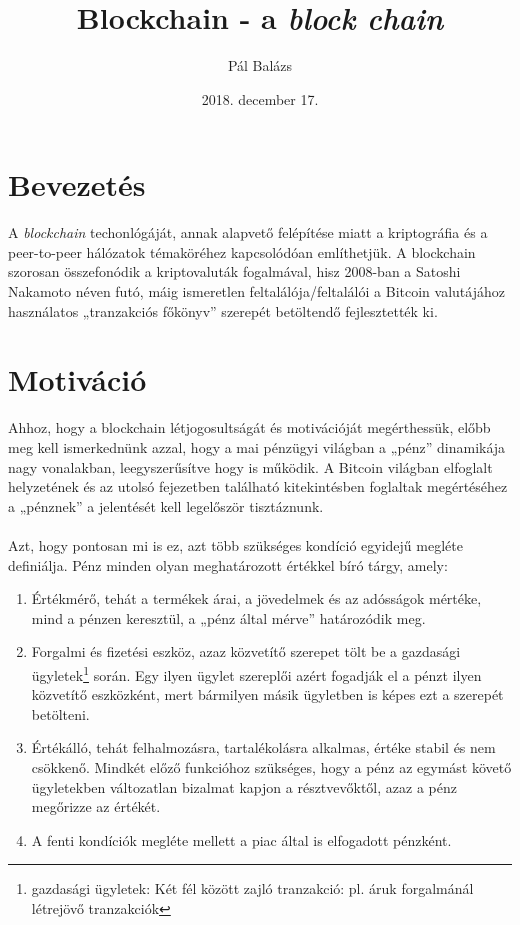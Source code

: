 \documentclass[11pt,a4paper]{article}
\title{Blockchain - a \textit{block chain}}
\author{Pál Balázs}
\date{2018. december 17.}
\newcommand{\q}[1]{„#1''} %
\begin{document}
\maketitle

\section{Bevezetés}
A \textit{blockchain} techonlógáját, annak alapvető felépítése miatt a kriptográfia és a peer-to-peer hálózatok témaköréhez kapcsolódóan említhetjük. A blockchain szorosan összefonódik a kriptovaluták fogalmával, hisz 2008-ban a Satoshi Nakamoto néven futó, máig ismeretlen feltalálója/feltalálói a Bitcoin valutájához használatos \q{tranzakciós főkönyv} szerepét betöltendő fejlesztették ki.

\section{Motiváció}
Ahhoz, hogy a blockchain létjogosultságát és motivációját megérthessük, előbb meg kell ismerkednünk azzal, hogy a mai pénzügyi világban a \q{pénz} dinamikája nagy vonalakban, leegyszerűsítve hogy is működik. A Bitcoin világban elfoglalt helyzetének és az utolsó fejezetben található kitekintésben foglaltak megértéséhez a \q{pénznek} a jelentését kell legelőször tisztáznunk.
\\ \\
Azt, hogy pontosan mi is ez, azt több szükséges kondíció egyidejű megléte definiálja. Pénz minden olyan meghatározott értékkel bíró tárgy, amely:

\begin{enumerate}
    \item Értékmérő, tehát a termékek árai, a jövedelmek és az adósságok mértéke, mind a pénzen keresztül, a \q{pénz által mérve} határozódik meg.
    \item Forgalmi és fizetési eszköz, azaz közvetítő szerepet tölt be a gazdasági ügyletek\footnote{gazdasági ügyletek: Két fél között zajló tranzakció: pl. áruk forgalmánál létrejövő tranzakciók} során. Egy ilyen ügylet szereplői azért fogadják el a pénzt ilyen közvetítő eszközként, mert bármilyen másik ügyletben is képes ezt a szerepét betölteni.
    \item Értékálló, tehát felhalmozásra, tartalékolásra alkalmas, értéke stabil és nem csökkenő. Mindkét előző funkcióhoz szükséges, hogy a pénz az egymást követő ügyletekben változatlan bizalmat kapjon a résztvevőktől, azaz a pénz megőrizze az értékét.
    \item A fenti kondíciók megléte mellett a piac által is elfogadott pénzként.
\end{enumerate}
\end{document}
